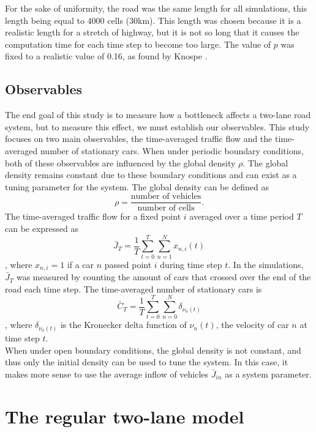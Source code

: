 \documentclass[11pt]{article}
\begin{document}
	For the sake of uniformity, the road was the same length for all simulations, this length being equal to 4000 cells (30km). This length was chosen because it is a realistic length for a stretch of highway, but it is not so long that it causes the computation time for each time step to become too large. The value of $p$ was fixed to a realistic value of 0.16, as found by Knospe \cite{duepublico_mods_00005368}. \\
	
	\subsection{Observables}\label{subsec:obs}
	
	The end goal of this study is to measure how a bottleneck affects a two-lane road system, but to measure this effect, we must establish our observables. This study focuses on two main observables, the time-averaged traffic flow and the time-averaged number of stationary cars. When under periodic boundary conditions, both of these observables are influenced by the global density $\rho$. The global density remains constant due to these boundary conditions and can exist as a tuning parameter for the system. The global density can be defined as
	\[ \rho = \frac{\text{number of vehicles}}{\text{number of cells}}. \]
	The time-averaged traffic flow for a fixed point $i$ averaged over a time period $T$ can be expressed as
	\[ \bar{J}_T = \frac{1}{T} \sum^{T}_{t=0} \sum^{N}_{n=1} x_{n,i}(t) \],
	where $x_{n,i} = 1$ if a car $n$ passed point $i$ during time step $t$. In the simulations, $\bar{J}_T$ was measured by counting the amount of cars that crossed over the end of the road each time step.
	The time-averaged number of stationary cars is
	\[ \bar{C}_T = \frac{1}{T} \sum^{T}_{t=0} \sum^{N}_{n=0} \delta_{\nu_n(t)} \],
	where $\delta_{\nu_n(t)}$ is the Kronecker delta function of $\nu_{n}(t)$, the velocity of car $n$ at time step $t$. \\
	When under open boundary conditions, the global density is not constant, and thus only the initial density can be used to tune the system. In this case, it makes more sense to use the average inflow of vehicles $\bar{J}_{in}$ as a system parameter.\\
	
	\section{The regular two-lane model} \label{sec:regularNaSch}
	
\end{document}
